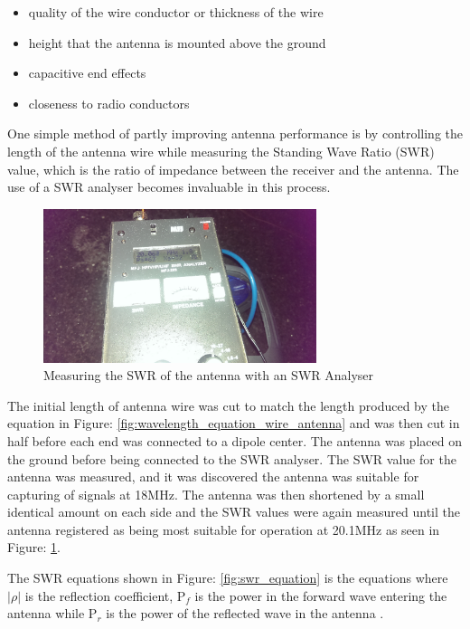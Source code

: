 \documentclass[runningheads,a4paper]{llncs}
\begin{document}
\begin{itemize}
	\item quality of the wire conductor or thickness of the wire
	\item height that the antenna is mounted above the ground
	\item capacitive end effects
	\item closeness to radio conductors
\end{itemize}

One simple method of partly improving antenna performance is by controlling the length of the antenna wire while measuring the Standing Wave Ratio (\gls{SWR}) value, which is the ratio of impedance between the receiver and the antenna. The use of a \gls{SWR} analyser becomes invaluable in this process.

%
\begin{figure}[here]
\centering
\includegraphics[width=8cm]{images/34}
\caption{Measuring the SWR of the antenna with an SWR Analyser}
\label{fig:swr_analyser_measuring_antenna}
\end{figure}
%

The initial length of antenna wire was cut to match the length produced by the equation in Figure: \ref{fig:wavelength_equation_wire_antenna} and was then cut in half before each end was connected to a dipole center. The antenna was placed on the ground before being connected to the \gls{SWR} analyser. The \gls{SWR} value for the antenna was measured, and it was discovered the antenna was suitable for capturing of signals at 18MHz. The antenna was then shortened by a small identical amount on each side and the \gls{SWR} values were again measured until the antenna registered as being most suitable for operation at 20.1MHz as seen in Figure:  \ref{fig:swr_analyser_measuring_antenna}. 

The \gls{SWR} equations shown in Figure: \ref{fig:swr_equation} is the  equations where $|\rho|$ is the reflection coefficient, P$_{f}$ is the power in the forward wave entering the antenna while P$_{r}$ is the power of the reflected wave in the antenna \citep{arrl-00}.
\end{document}
